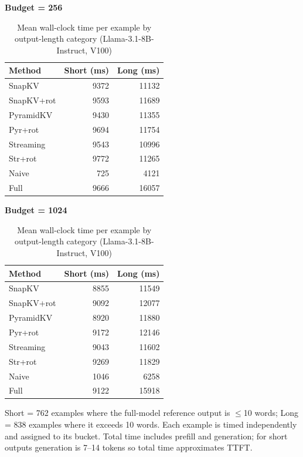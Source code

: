 \documentclass[10pt,letterpaper]{article}
\begin{document}
\begin{table}[H]
\centering
\small
\caption{Mean wall-clock time per example by output-length category (Llama-3.1-8B-Instruct, V100)}
\label{tab:instruct-timing}
\begin{minipage}[t]{0.47\textwidth}
\centering
\textbf{Budget = 256}\\[4pt]
\begin{tabular}{@{}lrr@{}}
\toprule
Method & Short (ms) & Long (ms)\\
\midrule
SnapKV     &  9372 & 11132\\
SnapKV+rot &  9593 & 11689\\
PyramidKV  &  9430 & 11355\\
Pyr+rot    &  9694 & 11754\\
Streaming  &  9543 & 10996\\
Str+rot   &  9772 & 11265\\
Naive      &   725 &  4121\\
Full       &  9666 & 16057\\
\bottomrule
\end{tabular}
\end{minipage}
\hfill
\begin{minipage}[t]{0.47\textwidth}
\centering
\textbf{Budget = 1024}\\[4pt]
\begin{tabular}{@{}lrr@{}}
\toprule
Method & Short (ms) & Long (ms)\\
\midrule
SnapKV     &  8855 & 11549\\
SnapKV+rot &  9092 & 12077\\
PyramidKV  &  8920 & 11880\\
Pyr+rot    &  9172 & 12146\\
Streaming  &  9043 & 11602\\
Str+rot   &  9269 & 11829\\
Naive      &  1046 &  6258\\
Full       &  9122 & 15918\\
\bottomrule
\end{tabular}
\end{minipage}

\medskip
Short = 762 examples where the full-model reference output is $\leq$10 words;
Long = 838 examples where it exceeds 10 words. Each example is timed
independently and assigned to its bucket. Total time includes prefill and
generation; for short outputs generation is 7--14 tokens so total
time approximates TTFT.
\end{table}
\end{document}
